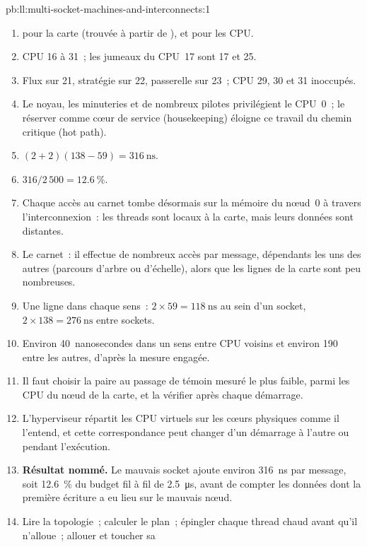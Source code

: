 \begin{solution}{pb:ll:multi-socket-machines-and-interconnects:1}
\begin{enumerate}
\item {} pour la carte (trouvée à partir de
), et  pour les CPU.
\item CPU 16 à 31~; les jumeaux du CPU~17 sont 17 et 25.
\item Flux sur 21, stratégie sur 22, passerelle sur 23~; CPU 29, 30 et 31 inoccupés.
\item Le noyau, les minuteries et de nombreux pilotes privilégient le CPU~0~; le réserver comme cœur de service (housekeeping)
éloigne ce travail du chemin critique (hot path).
\item $(2 + 2)(138 - 59) = \qty{316}{\nano\second}$.
\item $316/2\,500 = 12.6~\%$.
\item Chaque accès au carnet tombe désormais sur la mémoire du nœud~0 à travers l'interconnexion~: les threads sont
locaux à la carte, mais leurs données sont distantes.
\item Le carnet~: il effectue de nombreux accès par message, dépendants les uns des autres (parcours d'arbre ou d'échelle), alors que les lignes de la carte sont peu nombreuses.
\item Une ligne dans chaque sens~: $2 \times 59 = \qty{118}{\nano\second}$ au sein d'un socket, $2 \times 138 = \qty{276}{\nano\second}$
entre sockets.
\item Environ 40~nanosecondes dans un sens entre CPU voisins et environ 190 entre les autres, d'après la
mesure engagée.
\item Il faut choisir la paire au passage de témoin mesuré le plus faible, parmi les CPU du nœud de la carte, et la vérifier après chaque démarrage.
\item L'hyperviseur répartit les CPU virtuels sur les cœurs physiques comme il l'entend, et cette correspondance peut
changer d'un démarrage à l'autre ou pendant l'exécution.
\item \textbf{Résultat nommé.} Le mauvais socket ajoute environ \qty{316}{\nano\second} par message, soit 12.6~\% du
budget fil à fil de \qty{2.5}{\micro\second}, avant de compter les données dont la première écriture a eu lieu sur le mauvais nœud.
\item Lire la topologie~; calculer le plan~; épingler chaque thread chaud avant qu'il n'alloue~; allouer et toucher sa

\end{enumerate}
\end{solution}

